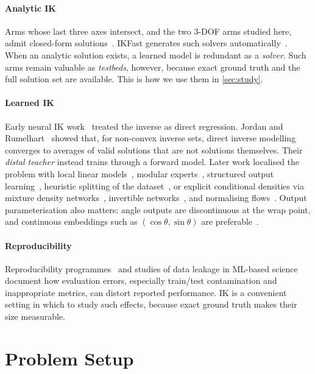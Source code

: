 \documentclass[conference]{IEEEtran}
\begin{document}
\paragraph{Analytic IK}
Arms whose last three axes intersect, and the two 3-DOF arms studied here, admit closed-form solutions~\cite{pieper1968kinematics,siciliano2009robotics}. IKFast generates such solvers automatically~\cite{diankov2010automated}. When an analytic solution exists, a learned model is redundant as a \emph{solver}. Such arms remain valuable as \emph{testbeds}, however, because exact ground truth and the full solution set are available. This is how we use them in \cref{sec:study}.

\paragraph{Learned IK}
Early neural IK work~\cite{guez1988solution} treated the inverse as direct regression. Jordan and Rumelhart~\cite{jordan1992forward} showed that, for non-convex inverse sets, direct inverse modelling converges to averages of valid solutions that are not solutions themselves. Their \emph{distal teacher} instead trains through a forward model. Later work localised the problem with local linear models~\cite{dsouza2001learning}, modular experts~\cite{oyama2001modular}, structured output learning~\cite{bocsi2011learning}, heuristic splitting of the dataset~\cite{csiszar2017solving}, or explicit conditional densities via mixture density networks~\cite{bishop1994mixture}, invertible networks~\cite{ardizzone2019analyzing}, and normalising flows~\cite{ames2022ikflow}. Output parameterisation also matters: angle outputs are discontinuous at the wrap point, and continuous embeddings such as $(\cos\theta,\sin\theta)$ are preferable~\cite{zhou2019continuity}.

\paragraph{Reproducibility}
Reproducibility programmes~\cite{pineau2021improving} and studies of data leakage in ML-based science~\cite{kapoor2023leakage} document how evaluation errors, especially train/test contamination and inappropriate metrics, can distort reported performance. IK is a convenient setting in which to study such effects, because exact ground truth makes their size measurable.

\section{Problem Setup}
\label{sec:setup}
\end{document}
